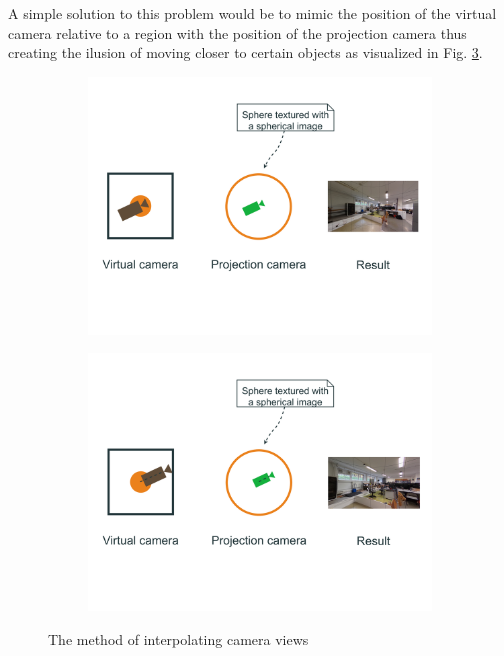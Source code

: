 \documentclass{svproc}
\begin{document}
A simple solution to this problem would be to mimic the position of the virtual camera relative to a region with the position of the projection camera thus creating the ilusion of moving closer to certain objects as visualized in Fig. \ref{fig:interpolation}.
\begin{figure}[!ht]
    \begin{subfigure}{\textwidth}
        \centering
        \includegraphics[width=0.9\linewidth]{img/drawio/interpolation-2.pdf}
        \caption{}
        \label{fig:interpolation1}
    \end{subfigure}
    \begin{subfigure}{\textwidth}
        \centering
        \includegraphics[width=0.9\linewidth]{img/drawio/interpolation-3.pdf}
        \caption{}
        \label{fig:interpolation2}
    \end{subfigure}
    \caption{The method of interpolating camera views}
    \label{fig:interpolation}
\end{figure}
\end{document}
